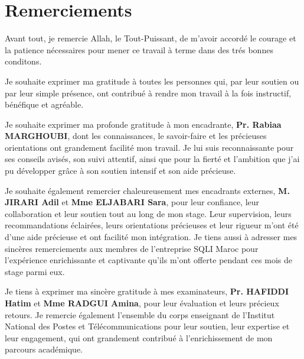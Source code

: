 \chapter*{Remerciements}



Avant tout, je remercie Allah, le Tout-Puissant, de m'avoir accordé le courage et la patience nécessaires pour mener ce travail à terme dans des trés bonnes conditons.

\vspace{10pt}
Je souhaite exprimer ma gratitude à toutes les personnes qui, par leur soutien ou par leur simple présence, ont contribué à rendre mon travail à la fois instructif, bénéfique et agréable.

\vspace{10pt}
Je souhaite exprimer ma profonde gratitude à mon encadrante, \textbf{Pr. Rabiaa MARGHOUBI}, dont les connaissances, le savoir-faire et les précieuses orientations ont grandement facilité mon travail. Je lui suis reconnaissante pour ses conseils avisés, son suivi attentif, ainsi que pour la fierté et l'ambition que j'ai pu développer grâce à son soutien intensif et son aide précieuse.

\vspace{10pt}
Je souhaite également remercier chaleureusement mes encadrants externes, \textbf{M. JIRARI Adil} et \textbf{Mme ELJABARI Sara}, pour leur confiance, leur collaboration et leur soutien tout au long de mon stage. Leur supervision, leurs recommandations éclairées, leurs orientations précieuses et leur rigueur m'ont été d'une aide précieuse et ont facilité mon intégration. Je tiens aussi à adresser mes sincères remerciements aux membres de l'entreprise SQLI Maroc pour l'expérience enrichissante et captivante qu'ils m'ont offerte pendant ces mois de stage parmi eux.

\vspace{10pt}
Je tiens à exprimer ma sincère gratitude à mes examinateurs, \textbf{Pr. HAFIDDI Hatim} et \textbf{Mme RADGUI Amina}, pour leur évaluation et leurs précieux retours. Je remercie également l'ensemble du corps enseignant de l’Institut National des Postes et Télécommunications pour leur soutien, leur expertise et leur engagement, qui ont grandement contribué à l’enrichissement de mon parcours académique.